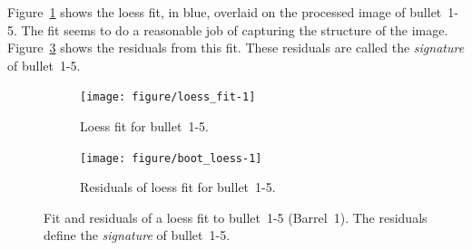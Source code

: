 \documentclass[aoas, preprint]{imsart}\usepackage[]{graphicx}\usepackage[]{color}
\newenvironment{knitrout}{}{} %
\newcommand{\hh}[1]{{\color{magenta} #1}}
\begin{document}

Figure~\ref{fig:loess_fit} shows the loess fit, in blue, overlaid on the processed image of bullet~1-5. The fit seems to do a reasonable job of capturing the structure of the image. %
Figure~\ref{fig:loess_resid} shows the residuals from this fit. These residuals are called the \emph{signature} of bullet~1-5.
%
\begin{figure}[hbtp]
  \centering
\begin{subfigure}[b]{.49\textwidth}\centering
\caption{\label{fig:loess_fit} Loess fit for bullet~1-5.}
\begin{knitrout}
\color{fgcolor}
\texttt{[image: figure/loess\_fit-1]} 

\end{knitrout}
\end{subfigure}
\begin{subfigure}[b]{.49\textwidth}\centering
\caption{\label{fig:loess_resid} Residuals of loess fit for bullet~1-5.
}
\begin{knitrout}
\color{fgcolor}
\texttt{[image: figure/boot\_loess-1]} 

\end{knitrout}
\end{subfigure}
\caption{Fit and residuals of a loess fit to bullet~1-5 (Barrel~1). The residuals define the {\it signature} of bullet~1-5. %
}
\end{figure}
%
\end{document}
